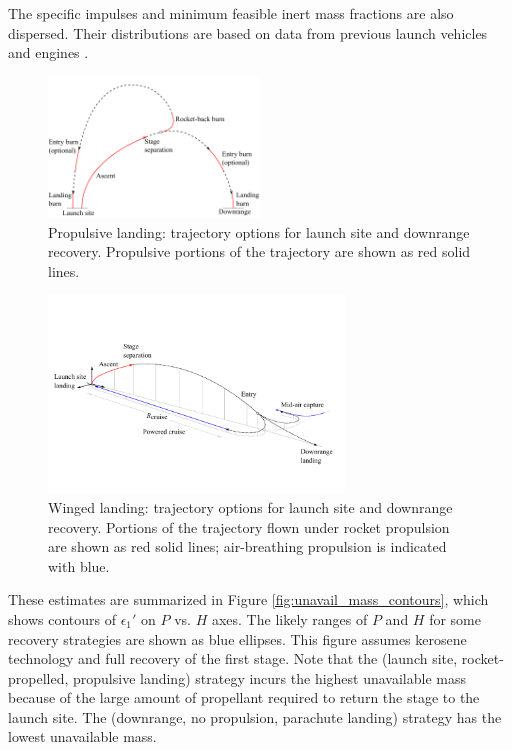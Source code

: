 \documentclass[conf]{new-aiaa}
\begin{document}
The specific impulses and minimum feasible inert mass fractions are also dispersed. Their distributions are based on data from previous launch vehicles and engines \cite{Isakowitz2004, hist_lpre}. 

\begin{figure}[hbt!]
    \centering
    \includegraphics[width=0.5\textwidth]{propulsive_landing}
    \caption{\label{fig:propulsive_landing} Propulsive landing: trajectory options for launch site and downrange recovery. Propulsive portions of the trajectory are shown as red solid lines.}
\end{figure}


\begin{figure}[hbt!]
    \centering
    \includegraphics[width=0.7\textwidth]{flyback_trajectory}
    \caption{\label{fig:flyback_trajectory} Winged landing: trajectory options for launch site and downrange recovery. Portions of the trajectory flown under rocket propulsion are shown as red solid lines; air-breathing propulsion is indicated with blue.}
\end{figure}

These estimates are summarized in Figure \ref{fig:unavail_mass_contours}, which shows contours of $\epsilon_1'$ on $P$ vs. $H$ axes. The likely ranges of $P$ and $H$ for some recovery strategies are shown as blue ellipses. This figure assumes kerosene technology and full recovery of the first stage. Note that the (launch site, rocket-propelled, propulsive landing) strategy incurs the highest unavailable mass because of the large amount of propellant required to return the stage to the launch site. The (downrange, no propulsion, parachute landing) strategy has the lowest unavailable mass. 
\end{document}
